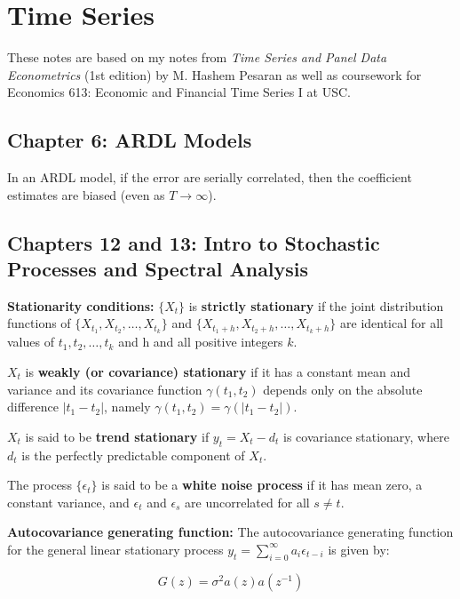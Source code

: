 %
%
%
%
%
%
%

\section{Time Series}

These notes are based on my notes from \textit{Time Series and Panel Data Econometrics} (1st edition) by M. Hashem Pesaran as well as coursework for Economics 613: Economic and Financial Time Series I at USC.

\subsection{Chapter 6: ARDL Models}

In an ARDL model, if the error are serially correlated, then the coefficient estimates are biased (even as \(T \to \infty\)).


\subsection{Chapters 12 and 13: Intro to Stochastic Processes and Spectral Analysis}

\textbf{Stationarity conditions:} \( \{X_t\} \) is \textbf{strictly stationary} if the joint distribution functions of \( \{ X_{t_1}, X_{t_2}, \ldots, X_{t_k}\} \) and \( \{ X_{t_1+h}, X_{t_2+h}, \ldots, X_{t_k+h}\} \) are identical for all values of \(t_1,  t_2, \ldots, t_k\) and h and all positive integers \(k\). 

\(X_t\) is \textbf{weakly (or covariance) stationary} if it has a constant mean and variance and its covariance function \(\gamma(t_1, t_2)\) depends only on the absolute difference \(| t_1 - t_2|\), namely \(\gamma(t_1, t_2) = \gamma(|t_1 - t_2|)\).

\(X_t\) is said to be \textbf{trend stationary} if \(y_t = X_t - d_t\) is covariance stationary, where \(d_t\) is the perfectly predictable component of \(X_t\).

The process \(\{\epsilon_t\} \) is said to be a \textbf{white noise process} if it has mean zero, a constant variance, and \(\epsilon_t\) and \(\epsilon_s\) are uncorrelated for all \(s \neq t\).

\textbf{Autocovariance generating function:} The autocovariance generating function for the general linear stationary process \(y_t = \sum_{i=0}^\infty a_i \epsilon_{t-i}\) is given by:

\[
G(z) = \sigma^2 a(z)a(z^{-1})
\]

